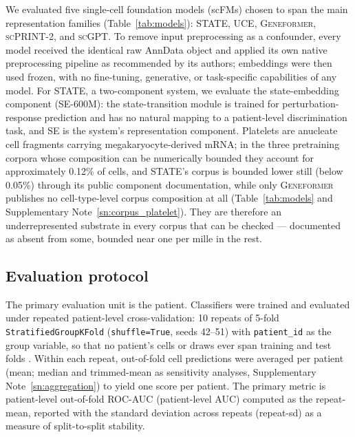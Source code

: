 \documentclass[11pt,a4paper]{article}
\newcommand{\model}[1]{\textsc{#1}}
\begin{document}
We evaluated five single-cell foundation models (scFMs) chosen to span the
main representation families (Table~\ref{tab:models}): \model{STATE},
\model{UCE}, \model{Geneformer}, \model{scPRINT-2}, and \model{scGPT}. To
remove input preprocessing as a confounder, every model received the identical
raw AnnData object \citep{wolf2018scanpy} and applied its own native
preprocessing pipeline as recommended by its authors; embeddings were then used frozen, with no
fine-tuning, generative, or task-specific capabilities of any model. For
\model{STATE}, a two-component system, we evaluate the state-embedding
component (SE-600M): the state-transition module is trained for
perturbation-response prediction and has no natural mapping to a
patient-level discrimination task, and SE is the system's representation
component. Platelets are anucleate cell fragments carrying
megakaryocyte-derived mRNA; in the three pretraining corpora whose
composition can be numerically bounded they account for approximately
0.12\% of cells, and \model{STATE}'s corpus is bounded lower still (below
0.05\%) through its public component documentation, while only
\model{Geneformer} publishes no cell-type-level corpus composition at all
(Table~\ref{tab:models} and Supplementary Note~\ref{sn:corpus_platelet}).
They are therefore an underrepresented substrate in every corpus that can
be checked --- documented as absent from some, bounded near one per mille
in the rest.

\subsection{Evaluation protocol}
\label{ssec:methods_cv}

The primary evaluation unit is the patient. Classifiers were trained and
evaluated under repeated patient-level cross-validation: 10 repeats of 5-fold
\texttt{StratifiedGroupKFold} (\texttt{shuffle=True}, seeds 42--51) with
\texttt{patient\_id} as the group variable, so that no patient's cells or
draws ever span training and test folds
\citep{varma2006bias, kapoor2023leakage, whalen2022pitfalls,
mcdermott2021reproducibility, koh2021wilds}. Within each repeat, out-of-fold cell
predictions were averaged per patient (mean; median and trimmed-mean as
sensitivity analyses, Supplementary Note~\ref{sn:aggregation}) to yield one
score per patient. The primary metric is patient-level out-of-fold ROC-AUC
(patient-level AUC) computed as the repeat-mean, reported with the standard
deviation across repeats (repeat-sd) as a measure of split-to-split stability.
\end{document}
